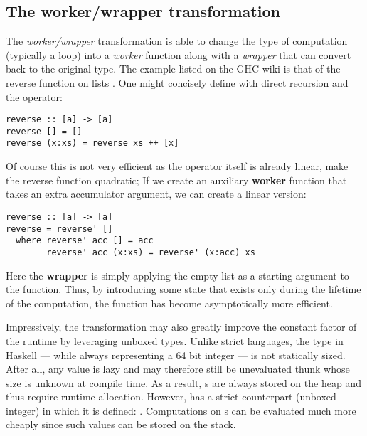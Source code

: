 \subsection{The worker/wrapper transformation}
\label{section:background:worker_wrapper}

The \textit{worker/wrapper} transformation is able to change the type of computation (typically a loop) into a \textit{worker} function
along with a \textit{wrapper} that can convert back to the original type. The example listed on the GHC wiki is that of the reverse
function on lists \cite{ghc_wiki_wwrapper}. One might concisely define with direct recursion and the \mono{++} operator:

\begin{listing}[H]
\begin{verbatim}
reverse :: [a] -> [a]
reverse [] = []
reverse (x:xs) = reverse xs ++ [x]
\end{verbatim}
\end{listing}

Of course this is not very efficient as the \mono{++} operator itself is already linear, make the reverse function quadratic; If we
create an auxiliary \textbf{worker} function  that takes an extra accumulator argument, we can create a linear version:

\begin{listing}[H]
\begin{verbatim}
reverse :: [a] -> [a]
reverse = reverse' []
  where reverse' acc [] = acc
        reverse' acc (x:xs) = reverse' (x:acc) xs
\end{verbatim}
\end{listing}

Here the \textbf{wrapper} is simply applying the empty list as a starting argument to the function. Thus, by introducing some state
that exists only during the lifetime of the computation, the function has become asymptotically more efficient.

Impressively, the transformation may also greatly improve the constant factor of the runtime by leveraging unboxed types.
Unlike strict languages, the  type in Haskell --- while always representing a 64 bit integer --- is not statically sized.
After all, any value is lazy and may therefore still be unevaluated thunk whose size is unknown at compile time. As a result, s
are always stored on the heap and thus require runtime allocation. However,  has a strict counterpart  (unboxed integer)
in which it is defined: . Computations on s can be evaluated much more cheaply since such values can be
stored on the stack.

